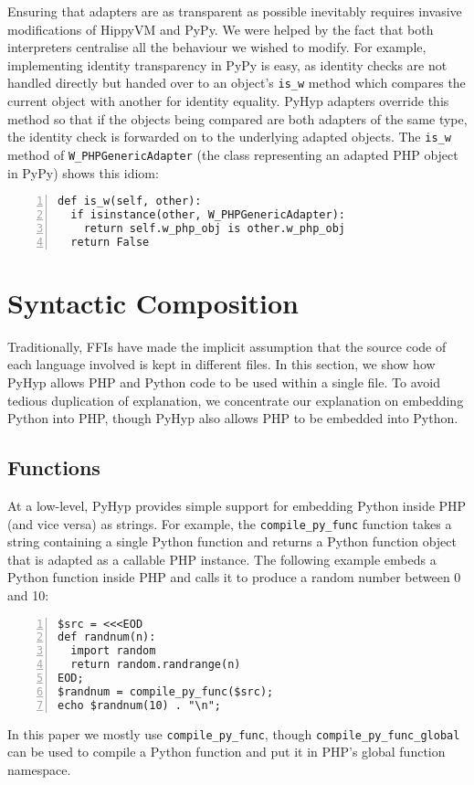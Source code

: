 \documentclass[a4paper,UKenglish]{lipics-v2016}
\newcommand{\ourvm}{PyHyp\xspace}
\newcommand{\hippy}{HippyVM\xspace}
\newcommand{\pypy}{PyPy\xspace}
\begin{document}
Ensuring that adapters are as transparent as possible inevitably requires invasive modifications of
\hippy and \pypy. We were helped by the fact that both interpreters
centralise all the behaviour we wished to modify. For example,
implementing identity transparency in \pypy is easy, as identity
checks are not handled directly but handed over to an object's
\texttt{is\_w} method which compares the current object with another
for identity equality. \ourvm adapters override this method so that if
the objects being compared are both adapters of the same type, the identity check is forwarded on to the
underlying adapted objects. The \texttt{is\_w} method of \texttt{W\_PHPGenericAdapter}
(the class representing an adapted PHP object in \pypy)
shows this idiom:
\begin{lstlisting}[numbers=left]
def is_w(self, other):
  if isinstance(other, W_PHPGenericAdapter):
    return self.w_php_obj is other.w_php_obj
  return False
\end{lstlisting}


\section{Syntactic Composition}
\label{sec:syntactic}

Traditionally, FFIs have made the implicit assumption that the source
code of each language involved is kept in different files. In this section, we
show how \ourvm allows PHP and Python code to be used within a single file. To avoid tedious
duplication of explanation, we concentrate our explanation on embedding
Python into PHP, though \ourvm also allows PHP to be embedded into Python.


\subsection{Functions}
\label{the embed functions}

At a low-level, \ourvm provides simple support for embedding Python inside
PHP (and vice versa) as strings. For example, the \texttt{compile\_py\_func} function takes a string
containing a single Python function and returns a Python function object
that is adapted as a callable PHP instance. The following example
embeds a Python function inside PHP and calls it to produce
a random number between 0 and 10:
\begin{lstlisting}[numbers=left]
$src = <<<EOD
def randnum(n):
  import random
  return random.randrange(n)
EOD;
$randnum = compile_py_func($src);
echo $randnum(10) . "\n";
\end{lstlisting}
In this paper we mostly use \texttt{compile\_py\_func},
though \texttt{compile\_py\_func\-\_global} can be used to compile
a Python function and put it in PHP's global function namespace.
\end{document}
